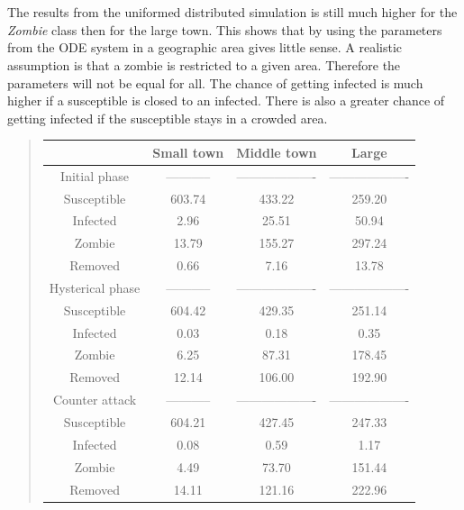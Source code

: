 \documentclass[%
twoside,                 %
final,                   %
10pt]{article}
\begin{document}
\\
\\
The results from the uniformed distributed simulation is still much higher for the \emph{Zombie} class then for the large town. This shows that by using the parameters from the ODE system in a geographic area gives little sense. A realistic assumption is that a zombie is restricted to a given area. Therefore the parameters will not be equal for all. The chance of getting infected is much higher if a susceptible is closed to an infected. There is also a greater chance of getting infected if the susceptible stays in a crowded area.

\label{table:compare_towns}

\begin{quote}
\begin{tabular}{cccc}
\hline
\multicolumn{1}{c}{  } & \multicolumn{1}{c}{ Small town } & \multicolumn{1}{c}{ Middle town } & \multicolumn{1}{c}{ Large } \\
\hline
Initial phase       & -----------         & ------------------- & ------------------- \\
\hline
Susceptible         & 603.74              & 433.22              & 259.20              \\
Infected            & 2.96                & 25.51               & 50.94               \\
Zombie              & 13.79               & 155.27              & 297.24              \\
Removed             & 0.66                & 7.16                & 13.78               \\
\hline
Hysterical phase    & -----------         & ------------------- & ------------------- \\
\hline
Susceptible         & 604.42              & 429.35              & 251.14              \\
Infected            & 0.03                & 0.18                & 0.35                \\
Zombie              & 6.25                & 87.31               & 178.45              \\
Removed             & 12.14               & 106.00              & 192.90              \\
\hline
Counter attack      & -----------         & ------------------- & ------------------- \\
\hline
Susceptible         & 604.21              & 427.45              & 247.33              \\
Infected            & 0.08                & 0.59                & 1.17                \\
Zombie              & 4.49                & 73.70               & 151.44              \\
Removed             & 14.11               & 121.16              & 222.96              \\
\hline
\end{tabular}
\end{quote}
\end{document}
